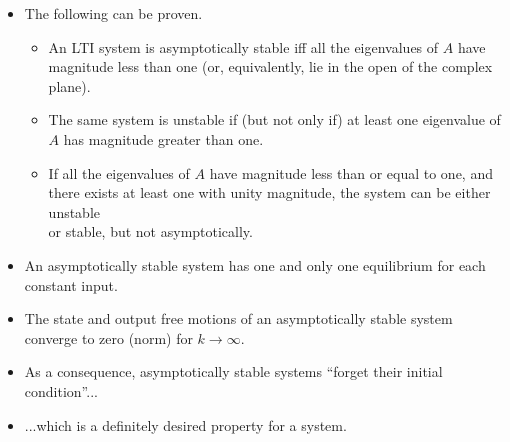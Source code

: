 \begin{frame}[label={pag:stab-eivals}]
\framesubtitleTC{}
\myPause
\begin{itemize}[<+-| alert@+>]
\item The following can be proven.
      \begin{itemize}[<+-| alert@+>]
      \item An LTI system is asymptotically stable iff all the eigenvalues of $A$ have magnitude less  than one
            (or, equivalently, lie in the open  of the complex plane).
      \item The same system is unstable if (but not only if) at least one eigenvalue of $A$ has magnitude greater
            than one.
      \item If all the eigenvalues of $A$ have magnitude less than or equal to one, and there exists at least one
            with unity magnitude, the system can be either unstable\\
            or stable, but not asymptotically.
      \end{itemize}
\end{itemize}
\end{frame}

\begin{frame}
\myPause
\begin{itemize}[<+-| alert@+>]
\item An asymptotically stable system has one and only one equilibrium for each constant input.
\item The state and output free motions of an asymptotically stable system converge to zero (norm)
      for $k\rightarrow\infty$.
\item As a consequence, asymptotically stable systems ``forget their initial condition''...
\item ...which is a definitely desired property for a  system.
\end{itemize}
\end{frame}

